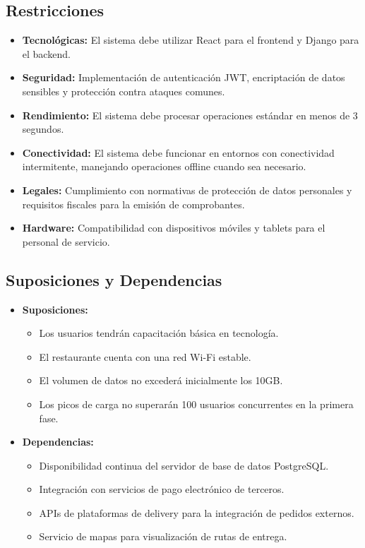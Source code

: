 \documentclass[12pt]{article}
\begin{document}
\subsection{Restricciones}
\begin{itemize}
  \item \textbf{Tecnológicas:} El sistema debe utilizar React para el frontend y Django para el backend.
  \item \textbf{Seguridad:} Implementación de autenticación JWT, encriptación de datos sensibles y protección contra ataques comunes.
  \item \textbf{Rendimiento:} El sistema debe procesar operaciones estándar en menos de 3 segundos.
  \item \textbf{Conectividad:} El sistema debe funcionar en entornos con conectividad intermitente, manejando operaciones offline cuando sea necesario.
  \item \textbf{Legales:} Cumplimiento con normativas de protección de datos personales y requisitos fiscales para la emisión de comprobantes.
  \item \textbf{Hardware:} Compatibilidad con dispositivos móviles y tablets para el personal de servicio.
\end{itemize}

\subsection{Suposiciones y Dependencias}
\begin{itemize}
  \item \textbf{Suposiciones:}
  \begin{itemize}
    \item Los usuarios tendrán capacitación básica en tecnología.
    \item El restaurante cuenta con una red Wi-Fi estable.
    \item El volumen de datos no excederá inicialmente los 10GB.
    \item Los picos de carga no superarán 100 usuarios concurrentes en la primera fase.
  \end{itemize}
  
  \item \textbf{Dependencias:}
  \begin{itemize}
    \item Disponibilidad continua del servidor de base de datos PostgreSQL.
    \item Integración con servicios de pago electrónico de terceros.
    \item APIs de plataformas de delivery para la integración de pedidos externos.
    \item Servicio de mapas para visualización de rutas de entrega.
  \end{itemize}
\end{itemize}
\end{document}
